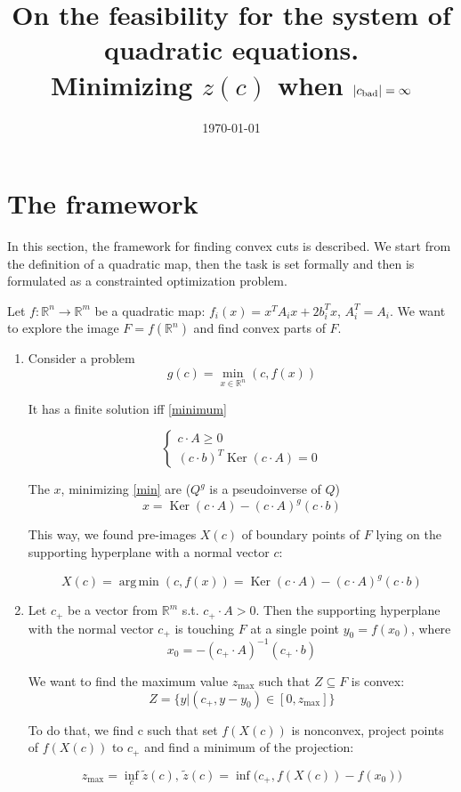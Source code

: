 \documentclass[a4paper]{article}
\date{\today}
\title{On the feasibility for the system of quadratic equations.\\Minimizing $z(c)$ when $|c_{\mathrm{bad}}|=\infty$}
\DeclareMathOperator{\Ker}{Ker}
\DeclareMathOperator*{\argmin}{arg\,min}
\begin{document}
\maketitle
\section{The framework}
In this section, the framework for finding convex cuts is described. We start from the definition of a quadratic map, then the task is set formally and then is formulated as a constrainted optimization problem.

Let $f\colon\mathbb{R}^n\to\mathbb{R}^m$ be a quadratic map: $f_i(x)=x^TA_ix+2b_i^Tx$, $A_i^T=A_i$. We want to explore the image $F=f(\mathbb{R}^n)$ and find convex parts of $F$.
\begin{enumerate}
\item Consider a problem
\begin{equation}
\label{min} g(c)=\min\limits_{x\in\mathbb{R}^n}(c,f(x))
\end{equation}

It has a finite solution iff \ref{minimum}

$$
\begin{cases}c\cdot A\geqslant0\\
(c\cdot b)^T\Ker (c\cdot A)=0\end{cases}
$$


The $x$, minimizing \ref{min} are ($Q^g$ is a pseudoinverse of $Q$)
$$x=\Ker(c\cdot A)-(c\cdot A)^g(c\cdot b)$$

This way, we found pre-images $X(c)$ of boundary points of $F$ lying on the supporting hyperplane with a normal vector $c$:

$$X(c)=\argmin (c, f(x))=\Ker(c\cdot A)-(c\cdot A)^g(c\cdot b)$$

\item Let $c_+$ be a vector from $\mathbb{R}^m$ s.t. $c_+\cdot A>0$. Then the supporting hyperplane with the normal vector $c_+$ is touching $F$ at a single point $y_0=f(x_0)$, where $$x_0=-(c_+\cdot A)^{-1}(c_+\cdot b)$$


We want to find the maximum value $z_{\max}$ such that $Z\subseteq F$ is convex:
$$Z=\{y\big| (c_+,y-y_0)\in[0,z_{\max}]\}$$

To do that, we find c such that set $f(X(c))$ is nonconvex, project points of $f(X(c))$ to $c_+$ and find a minimum of the projection:

\begin{equation}
\label{zc}
z_{\max}=\inf_c \tilde{z}(c),\, \tilde{z}(c)=\inf \big(c_+, f(X(c))-f(x_0)\big)
\end{equation}



\end{enumerate}
\end{document}
